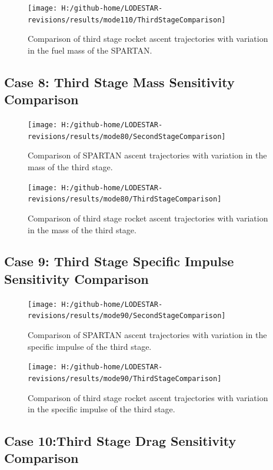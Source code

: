 \begin{figure}[!th]
\centering
\texttt{[image: H:/github-home/LODESTAR-revisions/results/mode110/ThirdStageComparison]}
\caption{Comparison of third stage rocket ascent trajectories with variation in the fuel mass of the SPARTAN.}
\label{fig:ThirdStageComparison5}
\end{figure}
\FloatBarrier
\clearpage
\subsection{Case 8: Third Stage Mass Sensitivity Comparison}\label{sec:app_comparison80}

\begin{figure}[!th]
\centering
\texttt{[image: H:/github-home/LODESTAR-revisions/results/mode80/SecondStageComparison]}
\caption{Comparison of SPARTAN ascent trajectories with variation in the mass of the third stage.}
\label{fig:SecondStageComparison6}
\end{figure}


\begin{figure}[!th]
\centering
\texttt{[image: H:/github-home/LODESTAR-revisions/results/mode80/ThirdStageComparison]}
\caption{Comparison of third stage rocket ascent trajectories with variation in the mass of the third stage.}
\label{fig:ThirdStageComparison6}
\end{figure}

\FloatBarrier
\clearpage
\subsection{Case 9: Third Stage Specific Impulse Sensitivity Comparison}\label{sec:app_comparison90}

\begin{figure}[!th]
	\centering
	\texttt{[image: H:/github-home/LODESTAR-revisions/results/mode90/SecondStageComparison]}
	\caption{Comparison of SPARTAN ascent trajectories with variation in the specific impulse of the third stage.}
	\label{fig:SecondStageComparison7}
\end{figure}

\begin{figure}[!th]
\centering
\texttt{[image: H:/github-home/LODESTAR-revisions/results/mode90/ThirdStageComparison]}
\caption{Comparison of third stage rocket ascent trajectories with variation in the specific impulse of the third stage.}
\label{fig:ThirdStageComparison7}
\end{figure}
\FloatBarrier
\clearpage
\subsection{Case 10:Third Stage Drag Sensitivity Comparison}\label{sec:app_comparison70}

